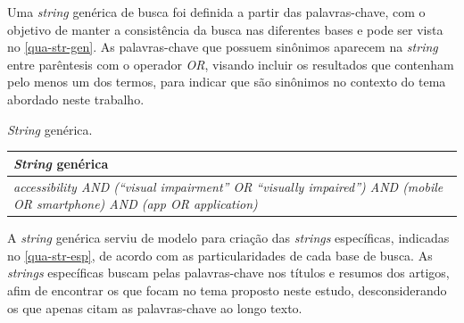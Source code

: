 Uma \emph{string} genérica de busca foi definida a partir das palavras-chave, com o objetivo de manter a consistência da busca nas diferentes bases e pode ser vista no \autoref{qua-str-gen}.
As palavras-chave que possuem sinônimos aparecem na \emph{string} entre parêntesis com o operador \emph{OR}, visando incluir os resultados que contenham pelo menos um dos termos, para indicar que são sinônimos no contexto do tema abordado neste trabalho.

\begin{quadro}[htb]
  \caption{\label{qua-str-gen}\emph{String} genérica.}
  \begin{tabular}{|m{11.5cm}|}
    \hline
    \textbf{\emph{String} genérica}                                                                                           \\
    \hline
    \emph{accessibility AND (“visual impairment” OR “visually impaired”) AND (mobile OR smartphone) AND (app OR application)} \\ \hline
  \end{tabular}
\end{quadro}

A \emph{string} genérica serviu de modelo para criação das \emph{strings} específicas, indicadas no \autoref{qua-str-esp}, de acordo com as particularidades de cada base de busca.
As \emph{strings} específicas buscam pelas palavras-chave nos títulos e resumos dos artigos, afim de encontrar os que focam no tema proposto neste estudo, desconsiderando os que apenas citam as palavras-chave ao longo texto.

